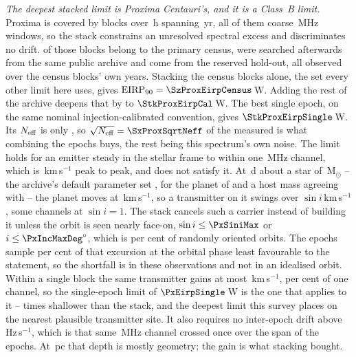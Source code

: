 \emph{The deepest stacked limit is Proxima Centauri's, and it is a Class~B
limit.} Proxima is covered by \StkProxN{} blocks over \StkProxHours\,h
spanning \StkProxSpanYr\,yr, all of them coarse \ChanBModeMHz\,MHz windows,
so the stack constrains an unresolved spectral excess and discriminates no
drift. \SxProxEbCensus{} of those blocks belong to the primary census,
\SzProxEbSearched{} were searched afterwards from the same public archive and
\SzProxEbHold{} come from the reserved hold-out, all observed over the census
blocks' own years. Stacking the census blocks alone, the set every other limit here uses,
gives $\mathrm{EIRP}_{90}=\SzProxEirpCensus$\,W. Adding the rest of the
archive deepens that by \SzProxDeepen{} to $\StkProxEirpCal$\,W. The best
single epoch, on the same nominal injection-calibrated convention, gives
$\StkProxEirpSingle$\,W. Its $N_{\rm eff}$ is only \StkProxNeff, so
$\sqrt{N_{\rm eff}}=\SxProxSqrtNeff$ of the measured \StkProxGain{} is what
combining the epochs buys, the rest being this spectrum's own noise.
The limit holds for an emitter steady in the stellar frame to within one
\ChanBModeMHz\,MHz channel, which is \StkProxTolKms\,km\,s$^{-1}$ peak to
peak, and \PxPlanet{} does not satisfy it. At \PxPorbD\,d about a star of
\PxMassMsun\,M$_\odot$ -- the archive's default parameter set
\citep{NEA2013}, for the planet of \citet{AngladaEscude2016} and a host mass
agreeing with \citet{Kervella2017} -- the planet moves at
\PxVorbKms\,km\,s$^{-1}$, so a
transmitter on it swings over \PxPPKms$\sin i$\,km\,s$^{-1}$, some
\PxNChanWalk{} channels at $\sin i=1$. The stack cancels such a
carrier instead of building it unless the orbit is seen nearly face-on,
$\sin i\le\PxSiniMax$ or $i\le\PxIncMaxDeg^\circ$, which is \PxIsoPct{} per
cent of randomly oriented orbits. The \PxNEpoch{} epochs sample
\PxFracSampled{} per cent of that excursion at the orbital phase least
favourable to the statement, so the shortfall is in these observations and
not in an idealised orbit. Within a single block the same transmitter gains
at most \PxBlockDvKms\,km\,s$^{-1}$, \PxBlockPct{} per cent of one channel,
so the single-epoch limit of $\PxEirpSingle$\,W is the one that applies to
it -- \PxEirpRatio{} times shallower than the stack, and the deepest limit
this survey places on the nearest plausible transmitter site. It also
requires no inter-epoch drift above
\StkProxDriftHzS\,Hz\,s$^{-1}$, which is that same \ChanBModeMHz\,MHz channel
crossed once over the span of the epochs. At \StkProxDistPc\,pc that depth is mostly
geometry; the gain is what stacking bought.

